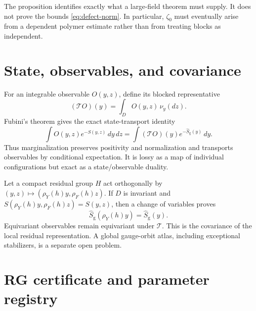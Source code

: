 \documentclass[11pt]{article}
\theoremstyle{definition}
\newcommand{\good}{\mathrm g}
\begin{document}
The proposition identifies exactly what a large-field theorem must supply.
It does not prove the bounds \eqref{eq:defect-norm}.  In particular,
$\zeta_0$ must eventually arise from a dependent polymer estimate rather than
from treating blocks as independent.

\section{State, observables, and covariance}

For an integrable observable $O(y,z)$, define its blocked representative
\begin{equation}\label{eq:observable}
 (\mathcal TO)(y)=\int_D O(y,z)\,\nu_y(dz).
\end{equation}
Fubini's theorem gives the exact state-transport identity
\begin{equation}\label{eq:state}
 \int O(y,z)e^{-S(y,z)}\,dy\,dz
 =\int (\mathcal TO)(y)e^{-\widehat S_{\good}(y)}\,dy.
\end{equation}
Thus marginalization preserves positivity and normalization and transports
observables by conditional expectation.  It is lossy as a map of individual
configurations but exact as a state/observable duality.

Let a compact residual group $H$ act orthogonally by
$(y,z)\mapsto(\rho_Y(h)y,\rho_F(h)z)$.  If $D$ is invariant and
$S(\rho_Y(h)y,\rho_F(h)z)=S(y,z)$, then a change of variables proves
\[
 \widehat S_{\good}(\rho_Y(h)y)=\widehat S_{\good}(y).
\]
Equivariant observables remain equivariant under $\mathcal T$.  This is the
covariance of the local residual representation.  A global gauge-orbit atlas,
including exceptional stabilizers, is a separate open problem.

\section{RG certificate and parameter registry}
\end{document}
